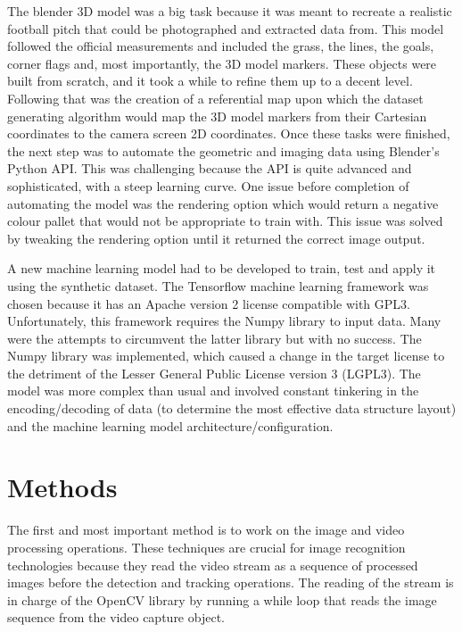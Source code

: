 \documentclass[
    11pt,
    oneside
]{report}
\begin{document}
The blender 3D model was a big task because it was meant to recreate a realistic football pitch that could be photographed and extracted data from. This model followed the official measurements and included the grass, the lines, the goals, corner flags and, most importantly, the 3D model markers. These objects were built from scratch, and it took a while to refine them up to a decent level. Following that was the creation of a referential map upon which the dataset generating algorithm would map the 3D model markers from their Cartesian coordinates to the camera screen 2D coordinates. Once these tasks were finished, the next step was to automate the geometric and imaging data using Blender's Python API. This was challenging because the API is quite advanced and sophisticated, with a steep learning curve. One issue before completion of automating the model was the rendering option which would return a negative colour pallet that would not be appropriate to train with. This issue was solved by tweaking the rendering option until it returned the correct image output.



A new machine learning model had to be developed to train, test and apply it using the synthetic dataset. The Tensorflow machine learning framework was chosen because it has an Apache version 2 license compatible with GPL3. Unfortunately, this framework requires the Numpy \cite{numpy} library to input data. Many were the attempts to circumvent the latter library but with no success. The Numpy \cite{numpy} library was implemented, which caused a change in the target license to the detriment of the Lesser General Public License version 3 (LGPL3). The model was more complex than usual and involved constant tinkering in the encoding/decoding of data (to determine the most effective data structure layout) and the machine learning model architecture/configuration.




\section{Methods}


The first and most important method is to work on the image and video processing operations. These techniques are crucial for image recognition technologies because they read the video stream as a sequence of processed images before the detection and tracking operations. The reading of the stream is in charge of the OpenCV \cite{opencv} library by running a while loop that reads the image sequence from the video capture object.
\end{document}
